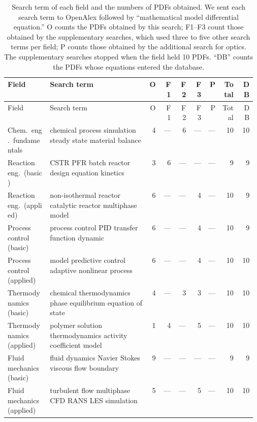 \begin{footnotesize}
\setlength{\tabcolsep}{3pt}
\begin{longtable}{@{}>{\raggedright\arraybackslash}p{0.17\linewidth}>{\raggedright\arraybackslash}p{0.40\linewidth}rrrrrrr@{}}
\caption{Search term of each field and the numbers of PDFs obtained. We sent each search term to OpenAlex followed by ``mathematical model differential equation.'' O counts the PDFs obtained by this search; F1--F3 count those obtained by the supplementary searches, which used three to five other search terms per field; P counts those obtained by the additional search for optics. The supplementary searches stopped when the field held 10 PDFs. ``DB'' counts the PDFs whose equations entered the database.}\label{tab:search}\\
\toprule
Field & Search term & O & F1 & F2 & F3 & P & Total & DB \\
\midrule
\endfirsthead
\toprule
Field & Search term & O & F1 & F2 & F3 & P & Total & DB \\
\midrule
\endhead
\bottomrule
\endlastfoot
Chem.\ eng.\ fundamentals & chemical process simulation steady state material balance & 4 & --- & 6 & --- & --- & 10 & 10 \\
Reaction eng.\ (basic) & CSTR PFR batch reactor design equation kinetics & 3 & 6 & --- & --- & --- & 9 & 9 \\
Reaction eng.\ (applied) & non-isothermal reactor catalytic reactor multiphase model & 6 & --- & --- & 4 & --- & 10 & 9 \\
Process control (basic) & process control PID transfer function dynamic & 6 & --- & --- & 4 & --- & 10 & 9 \\
Process control (applied) & model predictive control adaptive nonlinear process & 6 & --- & --- & 4 & --- & 10 & 10 \\
Thermodynamics (basic) & chemical thermodynamics phase equilibrium equation of state & 4 & --- & 3 & 3 & --- & 10 & 10 \\
Thermodynamics (applied) & polymer solution thermodynamics activity coefficient model & 1 & 4 & --- & 5 & --- & 10 & 10 \\
Fluid mechanics (basic) & fluid dynamics Navier Stokes viscous flow boundary & 9 & --- & --- & --- & --- & 9 & 9 \\
Fluid mechanics (applied) & turbulent flow multiphase CFD RANS LES simulation & 5 & --- & --- & 5 & --- & 10 & 10 \\

\end{longtable}
\end{footnotesize}
